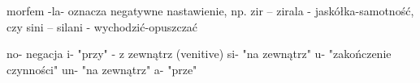 morfem -la- oznacza negatywne nastawienie, np. zir -- zirala -
jaskółka-samotność, czy sini -- silani - wychodzić-opuszczać

no- negacja
i- "przy" - z zewnątrz (venitive)
si- "na zewnątrz"
u- "zakończenie czynności"
un- "na zewnątrz"
a- "prze"